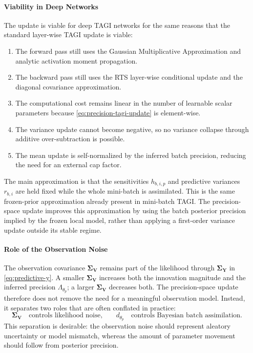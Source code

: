 \documentclass[11pt]{article}
\begin{document}
\paragraph{Viability in Deep Networks}
The update is viable for deep TAGI networks for the same reasons that the
standard layer-wise TAGI update is viable:
\begin{enumerate}
    \item The forward pass still uses the Gaussian Multiplicative
    Approximation and analytic activation moment propagation.
    \item The backward pass still uses the RTS layer-wise conditional update
    and the diagonal covariance approximation.
    \item The computational cost remains linear in the number of learnable
    scalar parameters because \eqref{eq:precision-tagi-update} is element-wise.
    \item The variance update cannot become negative, so no variance collapse
    through additive over-subtraction is possible.
    \item The mean update is self-normalized by the inferred batch precision,
    reducing the need for an external cap factor.
\end{enumerate}
The main approximation is that the sensitivities
\(
h_{b,i,p}
\)
and predictive variances
\(
r_{b,i}
\)
are held fixed while the whole mini-batch is assimilated. This is the same
frozen-prior approximation already present in mini-batch TAGI. The
precision-space update improves this approximation by using the batch
posterior precision implied by the frozen local model, rather than applying a
first-order variance update outside its stable regime.

\paragraph{Role of the Observation Noise}
The observation covariance
\(
\bm{\Sigma}_{\bm{V}}
\)
remains part of the likelihood through
\(
\bm{\Sigma}_{\bm{Y}}
\)
in \eqref{eq:predictive-y}. A smaller
\(
\bm{\Sigma}_{\bm{V}}
\)
increases both the innovation magnitude and the inferred precision
\(
\Lambda_{\theta_p}
\);
a larger
\(
\bm{\Sigma}_{\bm{V}}
\)
decreases both. The precision-space update therefore does not remove the need
for a meaningful observation model. Instead, it separates two roles that are
often conflated in practice:
\begin{equation}
    \bm{\Sigma}_{\bm{V}}
    \quad\text{controls likelihood noise,}
    \qquad
    d_{\theta_p}
    \quad\text{controls Bayesian batch assimilation.}
\end{equation}
This separation is desirable: the observation noise should represent
aleatory uncertainty or model mismatch, whereas the amount of parameter
movement should follow from posterior precision.
\end{document}

